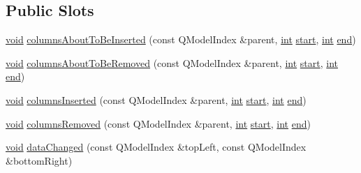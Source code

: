 \subsection*{Public Slots}
\begin{DoxyCompactItemize}
\item 
\hyperlink{group___u_a_v_objects_plugin_ga444cf2ff3f0ecbe028adce838d373f5c}{void} \hyperlink{class_qxt_flow_view_private_a570c0523aee0f109d8610e92bd5b4dac}{columns\-About\-To\-Be\-Inserted} (const Q\-Model\-Index \&parent, \hyperlink{ioapi_8h_a787fa3cf048117ba7123753c1e74fcd6}{int} \hyperlink{glext_8h_a13be19455586e95d5a42ed8f054afad2}{start}, \hyperlink{ioapi_8h_a787fa3cf048117ba7123753c1e74fcd6}{int} \hyperlink{glext_8h_a432111147038972f06e049e18a837002}{end})
\item 
\hyperlink{group___u_a_v_objects_plugin_ga444cf2ff3f0ecbe028adce838d373f5c}{void} \hyperlink{class_qxt_flow_view_private_a50df8fda96f0c5bcf7a8a280005a7f81}{columns\-About\-To\-Be\-Removed} (const Q\-Model\-Index \&parent, \hyperlink{ioapi_8h_a787fa3cf048117ba7123753c1e74fcd6}{int} \hyperlink{glext_8h_a13be19455586e95d5a42ed8f054afad2}{start}, \hyperlink{ioapi_8h_a787fa3cf048117ba7123753c1e74fcd6}{int} \hyperlink{glext_8h_a432111147038972f06e049e18a837002}{end})
\item 
\hyperlink{group___u_a_v_objects_plugin_ga444cf2ff3f0ecbe028adce838d373f5c}{void} \hyperlink{class_qxt_flow_view_private_ad850f93e28d0eac50ee24d30f26590b9}{columns\-Inserted} (const Q\-Model\-Index \&parent, \hyperlink{ioapi_8h_a787fa3cf048117ba7123753c1e74fcd6}{int} \hyperlink{glext_8h_a13be19455586e95d5a42ed8f054afad2}{start}, \hyperlink{ioapi_8h_a787fa3cf048117ba7123753c1e74fcd6}{int} \hyperlink{glext_8h_a432111147038972f06e049e18a837002}{end})
\item 
\hyperlink{group___u_a_v_objects_plugin_ga444cf2ff3f0ecbe028adce838d373f5c}{void} \hyperlink{class_qxt_flow_view_private_abddde17b6a962ede64d9f08c9626cd70}{columns\-Removed} (const Q\-Model\-Index \&parent, \hyperlink{ioapi_8h_a787fa3cf048117ba7123753c1e74fcd6}{int} \hyperlink{glext_8h_a13be19455586e95d5a42ed8f054afad2}{start}, \hyperlink{ioapi_8h_a787fa3cf048117ba7123753c1e74fcd6}{int} \hyperlink{glext_8h_a432111147038972f06e049e18a837002}{end})
\item 
\hyperlink{group___u_a_v_objects_plugin_ga444cf2ff3f0ecbe028adce838d373f5c}{void} \hyperlink{class_qxt_flow_view_private_abb82db2e9b8150e407b9b44dd7ec2a04}{data\-Changed} (const Q\-Model\-Index \&top\-Left, const Q\-Model\-Index \&bottom\-Right)
\item 

\end{DoxyCompactItemize}
